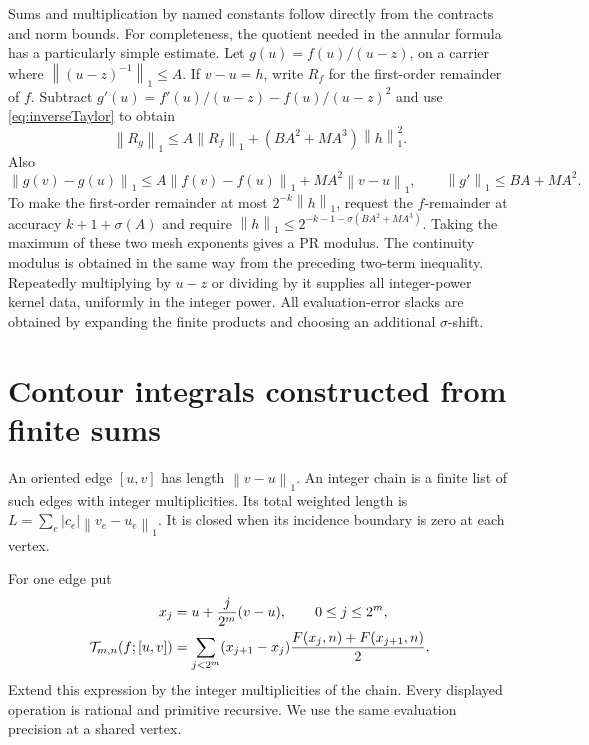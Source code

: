 \documentclass[11pt]{article}
\theoremstyle{definition}
\newcommand{\norm}[1]{\left\lVert#1\right\rVert_1}
\newcommand{\trap}{\mathcal T}
\begin{document}
Sums and multiplication by named constants follow directly from the
contracts and norm bounds. For completeness, the quotient needed in the
annular formula has a particularly simple estimate. Let
\(g(u)=f(u)/(u-z)\), on a carrier where
\(\norm{(u-z)^{-1}}\le A\). If \(v-u=h\), write \(R_f\) for the
first-order remainder of \(f\). Subtract
\(g'(u)=f'(u)/(u-z)-f(u)/(u-z)^2\) and use
\eqref{eq:inverseTaylor} to obtain
\begin{equation}\label{eq:quotientremainder}
 \norm{R_g}\le A\norm{R_f}+(BA^2+MA^3)\norm h^2.
\end{equation}
Also
\[
 \norm{g(v)-g(u)}\le
 A\norm{f(v)-f(u)}+MA^2\norm{v-u},\qquad
 \norm{g'}\le BA+MA^2.
\]
To make the first-order remainder at most \(2^{-k}\norm h\), request
the \(f\)-remainder at accuracy
\(k+1+\sigma(A)\) and require
\(\norm h\le2^{-k-1-\sigma(BA^2+MA^3)}\).
Taking the maximum of these two mesh exponents gives a PR modulus.
The continuity modulus is obtained in the same way from the preceding
two-term inequality. Repeatedly multiplying by \(u-z\) or dividing by
it supplies all integer-power kernel data, uniformly in the integer
power. All evaluation-error slacks are obtained by expanding the finite
products and choosing an additional \(\sigma\)-shift.

\section{Contour integrals constructed from finite sums}\label{sec:integral}

An oriented edge \([u,v]\) has length \(\norm{v-u}\). An integer chain
is a finite list of such edges with integer multiplicities. Its total
weighted length is \(L=\sum_e|c_e|\norm{v_e-u_e}\).
It is closed when its incidence boundary is zero at each vertex.

For one edge put
\begin{align}
 x_j&=u+\frac{j}{2^m}(v-u),\qquad 0\le j\le2^m,\notag\\
 \trap_{m,n}(f;[u,v])
   &=\sum_{j<2^m}(x_{j+1}-x_j)
                   \frac{F(x_j,n)+F(x_{j+1},n)}2.\label{eq:trap}
\end{align}
Extend this expression by the integer multiplicities of the chain.
Every displayed operation is rational and primitive recursive.
We use the same evaluation precision at a shared vertex.
\end{document}
